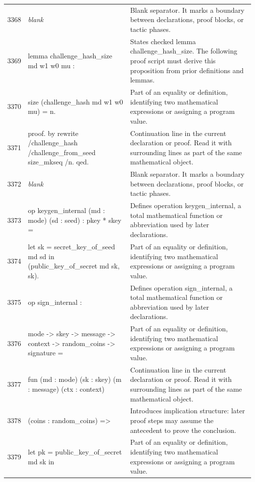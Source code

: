\documentclass[10pt]{article}
\begin{document}
\begin{longtable}{r L{0.53\textwidth} L{0.37\textwidth}}
3368 & {\ttfamily\scriptsize \emph{blank}} & Blank separator.  It marks a boundary between declarations, proof blocks, or tactic phases. \\
3369 & {\ttfamily\scriptsize lemma challenge\_hash\_size md w1 w0 mu :} & States checked lemma challenge\_hash\_size.  The following proof script must derive this proposition from prior definitions and lemmas. \\
3370 & {\ttfamily\scriptsize   size (challenge\_hash md w1 w0 mu) = n.} & Part of an equality or definition, identifying two mathematical expressions or assigning a program value. \\
3371 & {\ttfamily\scriptsize proof. by rewrite /challenge\_hash /challenge\_from\_seed size\_mkseq /n. qed.} & Continuation line in the current declaration or proof.  Read it with surrounding lines as part of the same mathematical object. \\
3372 & {\ttfamily\scriptsize \emph{blank}} & Blank separator.  It marks a boundary between declarations, proof blocks, or tactic phases. \\
3373 & {\ttfamily\scriptsize op keygen\_internal (md : mode) (sd : seed) : pkey * skey =} & Defines operation keygen\_internal, a total mathematical function or abbreviation used by later declarations. \\
3374 & {\ttfamily\scriptsize   let sk = secret\_key\_of\_seed md sd in (public\_key\_of\_secret md sk, sk).} & Part of an equality or definition, identifying two mathematical expressions or assigning a program value. \\
3375 & {\ttfamily\scriptsize op sign\_internal :} & Defines operation sign\_internal, a total mathematical function or abbreviation used by later declarations. \\
3376 & {\ttfamily\scriptsize   mode -> skey -> message -> context -> random\_coins -> signature =} & Part of an equality or definition, identifying two mathematical expressions or assigning a program value. \\
3377 & {\ttfamily\scriptsize   fun (md : mode) (sk : skey) (m : message) (ctx : context)} & Continuation line in the current declaration or proof.  Read it with surrounding lines as part of the same mathematical object. \\
3378 & {\ttfamily\scriptsize       (coins : random\_coins) =>} & Introduces implication structure: later proof steps may assume the antecedent to prove the conclusion. \\
3379 & {\ttfamily\scriptsize     let pk = public\_key\_of\_secret md sk in} & Part of an equality or definition, identifying two mathematical expressions or assigning a program value. \\

\end{longtable}
\end{document}
